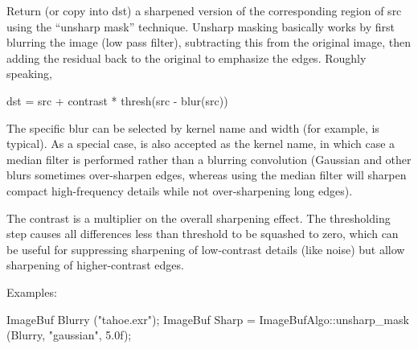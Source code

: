 \apiend


 
\label{sec:iba:unsharpmask}

Return (or copy into {\cf dst}) a sharpened version of the
corresponding region of {\cf src} using the ``unsharp mask'' technique.
Unsharp masking basically works by first blurring the image (low
pass filter), subtracting this from the original image, then
adding the residual back to the original to emphasize the edges.
Roughly speaking,

\begin{code}
     dst = src + contrast * thresh(src - blur(src))
\end{code}

The specific blur can be selected by kernel name and width (for example,
 is typical). As a special case,  is also accepted
as the kernel name, in which case a median filter is performed rather than
a blurring convolution (Gaussian and other blurs sometimes over-sharpen edges,
whereas using the median filter will sharpen compact high-frequency details
while not over-sharpening long edges).

The {\cf contrast} is a multiplier on the overall sharpening effect.  The
thresholding step causes all differences less than {\cf threshold} to be
squashed to zero, which can be useful for suppressing sharpening of
low-contrast details (like noise) but allow sharpening of
higher-contrast edges.

\smallskip
\noindent Examples:
\begin{code}
    ImageBuf Blurry ("tahoe.exr");
    ImageBuf Sharp = ImageBufAlgo::unsharp_mask (Blurry, "gaussian", 5.0f);
\end{code}
\apiend


